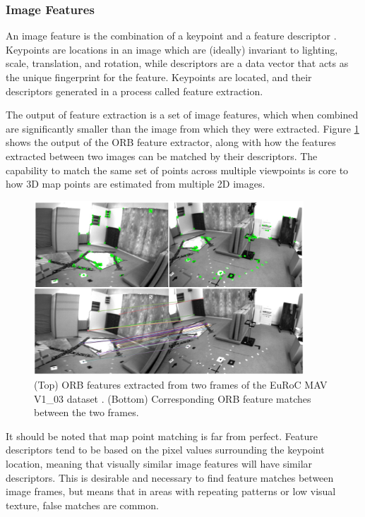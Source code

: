 \subsubsection{Image Features}

An image feature is the combination of a keypoint and a feature descriptor \cite{loweObjectRecognitionLocal1999}. Keypoints are locations in an image which are (ideally) invariant to lighting, scale, translation, and rotation\cite{shiGoodFeaturesTrack1994}, while descriptors are a data vector that acts as the unique fingerprint for the feature. Keypoints are located, and their descriptors generated in a process called feature extraction.

The output of feature extraction is a set of image features, which when combined are significantly smaller than the image from which they were extracted. Figure \ref{fig:feature_extraction_and_matching} shows the output of the ORB feature extractor, along with how the features extracted between two images can be matched by their descriptors. The capability to match the same set of points across multiple viewpoints is core to how 3D map points are estimated from multiple 2D images.

\begin{figure}[!ht]
    \centering
    \includegraphics[width=0.9\textwidth]{resources/feature_extraction_and_matching.png}
    \caption[Image Feature Extraction and Matching]{(Top) ORB features extracted from two frames of the EuRoC MAV V1\_03 dataset \cite{burriEuRoCMicroAerial2016}. (Bottom) Corresponding ORB feature matches between the two frames.}
    \label{fig:feature_extraction_and_matching}
\end{figure}

It should be noted that map point matching is far from perfect. Feature descriptors tend to be based on the pixel values surrounding the keypoint location, meaning that visually similar image features will have similar descriptors. This is desirable and necessary to find feature matches between image frames, but means that in areas with repeating patterns or low visual texture, false matches are common.

